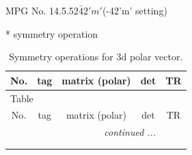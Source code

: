 \documentclass[fleqn,8pt]{jsarticle}
\begin{document}
\setcounter{MaxMatrixCols}{32}

\renewcommand{\tablename}{Table~}
\renewcommand{\figurename}{Figure~}
\begin{center}
\LARGE
MPG No. 14.5.52\quad$\bar{4}2'm'$\quad(-42'm' setting)
\end{center}
* symmetry operation
\renewcommand{\arraystretch}{1.3}
\begin{longtable}{ccccc}
\caption{Symmetry operations for 3d polar vector.}
 \\
 \hline \hline
No. & tag & matrix (polar) & det & TR \\ \hline \endfirsthead

\multicolumn{4}{l}{\tablename\ \thetable{}} \\
 \hline \hline
No. & tag & matrix (polar) & det & TR \\ \hline \endhead

 \hline \hline
\multicolumn{4}{r}{\footnotesize\it continued ...} \\ \endfoot

 \hline \hline
\multicolumn{4}{r}{} \\ \endlastfoot


\end{longtable}
\end{document}
